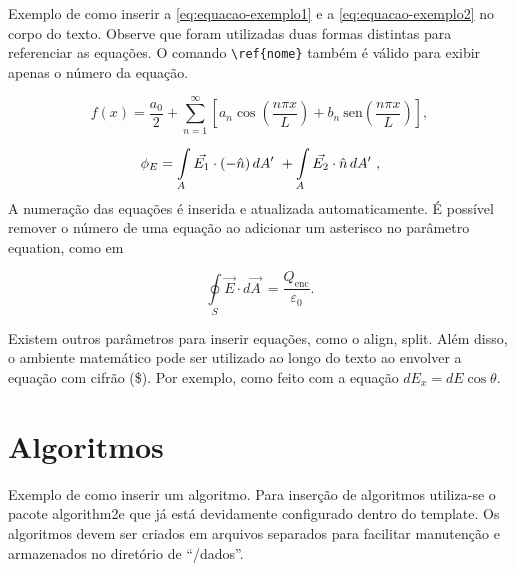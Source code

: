 Exemplo de como inserir a \autoref{eq:equacao-exemplo1} e a \cref{eq:equacao-exemplo2} no corpo do texto. Observe que foram utilizadas duas formas distintas para referenciar as equações. O comando \verb|\ref{nome}| também é válido para exibir apenas o número da equação.

\begin{equation}
    \label{eq:equacao-exemplo1}
    f(x) = \frac{a_0}{2} + \sum_{n=1}^{\infty} \left[a_n \cos{ \left( \frac{ n\pi x}{L} \right) }  +  b_n  \: \mathrm{sen}{ \left( \frac{ n\pi x}{L} \right) }     \right]
    ,
\end{equation}

\begin{align}
    \phi_E  = \int \limits_{A} \Vec{E_1}\cdot (-\Hat{n}) \, dA'\ + \int \limits_{A} \Vec{E_2}\cdot \Hat{n} \, dA'\ ,
    \label{eq:equacao-exemplo2}
\end{align}
\noindent
A numeração das equações é inserida e atualizada automaticamente. É possível remover o número de uma equação ao adicionar um asterisco no parâmetro  {\ttfamily equation}, como em

\begin{equation*}
    \oint \limits_S \Vec{E}\cdot d \Vec{A}\ =
    \frac{Q_{\mathrm{enc}}}{\varepsilon_0}
    .
\end{equation*}

Existem outros parâmetros para inserir equações, como o {\ttfamily align},  {\ttfamily split}.
Além disso, o ambiente matemático pode ser utilizado ao longo do texto ao envolver a equação com cifrão (\$). Por exemplo, como feito com a equação $ dE_x = dE \cos\theta $.

\section{Algoritmos}
\label{sec:algoritmos}

Exemplo de como inserir um algoritmo. Para inserção de algoritmos utiliza-se o pacote {\ttfamily algorithm2e} que já está devidamente configurado dentro do template.
Os algoritmos devem ser criados em arquivos separados para facilitar manutenção e armazenados no diretório de ``/dados''. \\


